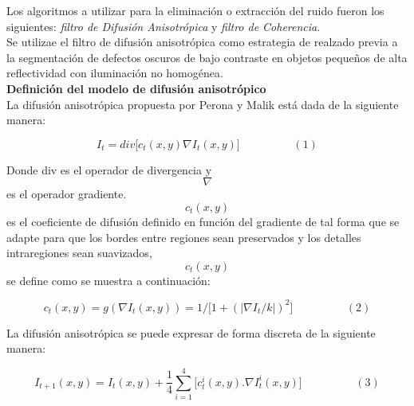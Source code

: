 Los algoritmos a utilizar para la eliminaci\'on o extracci\'on del ruido fueron los siguientes: \textit{filtro de Difusi\'on Anisotr\'opica} y \textit{filtro de  Coherencia}.\\



Se utilizae el filtro de difusi\'on anisotr\'opica como estrategia de realzado previa a la segmentaci\'on de defectos oscuros de bajo contraste en objetos peque\~nos de alta reflectividad con iluminaci\'on no homog\'enea.\\

\textbf{Definici\'on del modelo de difusi\'on anisotr\'opico}\\

La difusi\'on anisotr\'opica propuesta por Perona y Malik \cite{perona1990scale} está dada de la siguiente manera: 

\begin{displaymath}
I_t=div\lbrack c_t(x,y)\nabla I_t(x,y)\rbrack  \hspace{2cm}(1)
\end{displaymath}

Donde div  es el operador de divergencia y \begin{displaymath} \nabla \end{displaymath}   es el operador gradiente.  \begin{displaymath} c_t(x,y)\end{displaymath} es el coeficiente  de difusión definido en función del gradiente de tal forma que se adapte para que los bordes entre regiones sean preservados  y los detalles intraregiones sean suavizados, \begin{displaymath} c_t(x,y)\end{displaymath} se define como se muestra a continuación:

\begin{displaymath}
c_t(x,y)=g(\nabla I_t(x,y))=1/\lbrack1+(\left|\nabla I_t/k\right|)^2\rbrack \hspace{2cm}(2)
\end{displaymath}

La difusión anisotrópica  se puede expresar de forma discreta de la siguiente manera:

\begin{displaymath}
I_{t+1}(x,y)=I_t(x,y) + \frac14{{{\sum_{i=1}^{4} \lbrack c_t^i(x,y).\nabla I_t^i(x,y)\rbrack}}} \hspace{2cm}(3)
\end{displaymath}

